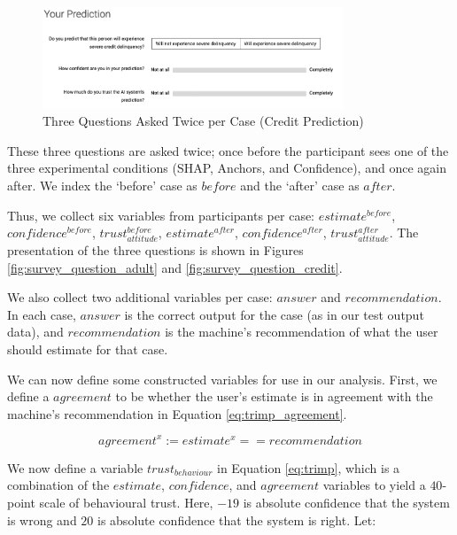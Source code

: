 \begin{figure}[htbp]
    \centering
    \includegraphics[width=0.8\textwidth]{figures/misleading_explanations/survey_question_credit.png}
    \caption{Three Questions Asked Twice per Case (Credit Prediction)}
    \label{fig:survey_question-credit}
\end{figure}

These three questions are asked twice; once before the participant sees one of the three experimental conditions (SHAP, Anchors, and Confidence), and once again after. We index the `before' case as $before$ and the `after' case as $after$. 

Thus, we collect six variables from participants per case: $estimate^{before}$, $confidence^{before}$, $trust_{attitude}^{before}$, $estimate^{after}$, $confidence^{after}$, $trust_{attitude}^{after}$. The presentation of the three questions is shown in Figures \ref{fig:survey_question_adult} and \ref{fig:survey_question_credit}.

We also collect two additional variables per case: $answer$ and $recommendation$. In each case, $answer$ is the correct output for the case (as in our test output data), and $recommendation$ is the machine's recommendation of what the user should estimate for that case. 

We can now define some constructed variables for use in our analysis. First, we define a $agreement$ to be whether the user's estimate is in agreement with the machine's recommendation in Equation \ref{eq:trimp_agreement}. 

\begin{equation}
    agreement^x := estimate^x == recommendation
    \label{eq:trimp_agreement}
\end{equation}

We now define a variable $trust_{behaviour}$ in Equation \ref{eq:trimp}, which is a combination of the $estimate$, $confidence$, and $agreement$ variables to yield a $40$-point scale of behavioural trust. Here, $-19$ is absolute confidence that the system is wrong and $20$ is absolute confidence that the system is right. Let:

